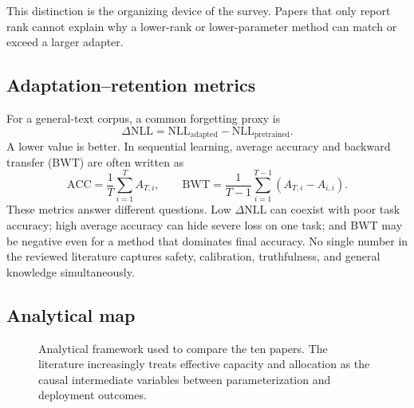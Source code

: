 \documentclass[11pt]{article}
\begin{document}
This distinction is the organizing device of the survey. Papers that only report rank cannot explain why a lower-rank or lower-parameter method can match or exceed a larger adapter.

\subsection{Adaptation--retention metrics}

For a general-text corpus, a common forgetting proxy is
\begin{equation}
\Delta\mathrm{NLL}
= \mathrm{NLL}_{\mathrm{adapted}}-\mathrm{NLL}_{\mathrm{pretrained}}.
\label{eq:nll}
\end{equation}
A lower value is better. In sequential learning, average accuracy and backward transfer (BWT) are often written as
\begin{equation}
\mathrm{ACC}=\frac{1}{T}\sum_{i=1}^{T}A_{T,i},
\qquad
\mathrm{BWT}=\frac{1}{T-1}\sum_{i=1}^{T-1}\left(A_{T,i}-A_{i,i}\right).
\label{eq:bwt}
\end{equation}
These metrics answer different questions. Low $\Delta\mathrm{NLL}$ can coexist with poor task accuracy; high average accuracy can hide severe loss on one task; and BWT may be negative even for a method that dominates final accuracy. No single number in the reviewed literature captures safety, calibration, truthfulness, and general knowledge simultaneously.

\subsection{Analytical map}

\begin{figure}[t]
\centering
{}
\caption{Analytical framework used to compare the ten papers. The literature increasingly treats effective capacity and allocation as the causal intermediate variables between parameterization and deployment outcomes.}
\label{fig:map}
\end{figure}
\end{document}
